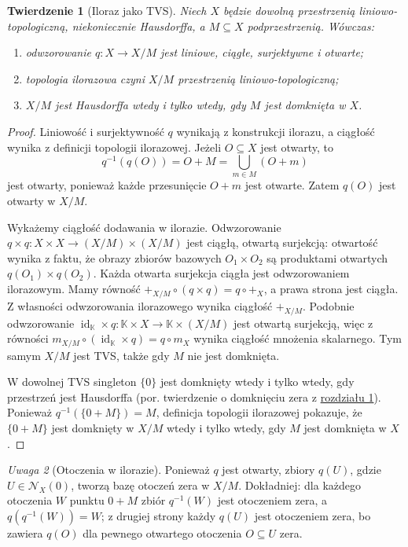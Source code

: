 \documentclass[11pt,a4paper]{article}
\numberwithin{equation}{section}
\theoremstyle{plain}
\newtheorem{twierdzenie}{Twierdzenie}[section]
\theoremstyle{definition}
\theoremstyle{remark}
\newtheorem{uwaga}[twierdzenie]{Uwaga}
\newcommand{\K}{\mathbb K}
\DeclareMathOperator{\id}{id}
\begin{document}
\begin{twierdzenie}[Iloraz jako TVS]\label{thm:quotient-tvs}
Niech $X$ będzie dowolną przestrzenią liniowo-topologiczną,
niekoniecznie Hausdorffa, a $M\subseteq X$ podprzestrzenią.
Wówczas:
\begin{enumerate}[label=\textup{(\roman*)}]
\item odwzorowanie $q:X\to X/M$ jest liniowe, ciągłe,
      surjektywne i otwarte;
\item topologia ilorazowa czyni $X/M$ przestrzenią
      liniowo-topologiczną;
\item $X/M$ jest Hausdorffa wtedy i tylko wtedy,
      gdy $M$ jest domknięta w $X$.
\end{enumerate}
\end{twierdzenie}
\begin{proof}
Liniowość i surjektywność $q$ wynikają z konstrukcji
ilorazu, a ciągłość wynika z definicji topologii ilorazowej.
Jeżeli $O\subseteq X$ jest otwarty, to
\[
 q^{-1}(q(O))=O+M=\bigcup_{m\in M}(O+m)
\]
jest otwarty, ponieważ każde przesunięcie $O+m$
jest otwarte. Zatem $q(O)$ jest otwarty w $X/M$.

Wykażemy ciągłość dodawania w ilorazie. Odwzorowanie
$q\times q:X\times X\to(X/M)\times(X/M)$ jest ciągłą,
otwartą surjekcją: otwartość wynika z faktu, że obrazy
zbiorów bazowych $O_1\times O_2$ są produktami
otwartych $q(O_1)\times q(O_2)$. Każda otwarta surjekcja
ciągła jest odwzorowaniem ilorazowym. Mamy równość
$+_{X/M}\circ(q\times q)=q\circ+_X$, a prawa strona
jest ciągła. Z własności odwzorowania ilorazowego wynika
ciągłość $+_{X/M}$. Podobnie odwzorowanie
$\id_\K\times q:\K\times X\to\K\times(X/M)$ jest
otwartą surjekcją, więc z równości
$m_{X/M}\circ(\id_\K\times q)=q\circ m_X$
wynika ciągłość mnożenia skalarnego. Tym samym $X/M$
jest TVS, także gdy $M$ nie jest domknięta.

W dowolnej TVS singleton $\{0\}$ jest domknięty
wtedy i tylko wtedy, gdy przestrzeń jest Hausdorffa
(por. twierdzenie o domknięciu zera z \hyperref[sec:tvs]{rozdziału 1}).
Ponieważ $q^{-1}(\{0+M\})=M$, definicja topologii
ilorazowej pokazuje, że $\{0+M\}$ jest domknięty
w $X/M$ wtedy i tylko wtedy, gdy $M$ jest domknięta w $X$.
\end{proof}

\begin{uwaga}[Otoczenia w ilorazie]\label{rem:q-neighborhood}
Ponieważ $q$ jest otwarty, zbiory $q(U)$, gdzie
$U\in\mathcal N_X(0)$, tworzą bazę otoczeń zera
w $X/M$. Dokładniej: dla każdego otoczenia $W$
punktu $0+M$ zbiór $q^{-1}(W)$ jest otoczeniem zera,
a $q(q^{-1}(W))=W$; z drugiej strony każdy $q(U)$
jest otoczeniem zera, bo zawiera $q(O)$ dla pewnego
otwartego otoczenia $O\subseteq U$ zera.
\end{uwaga}
\end{document}
